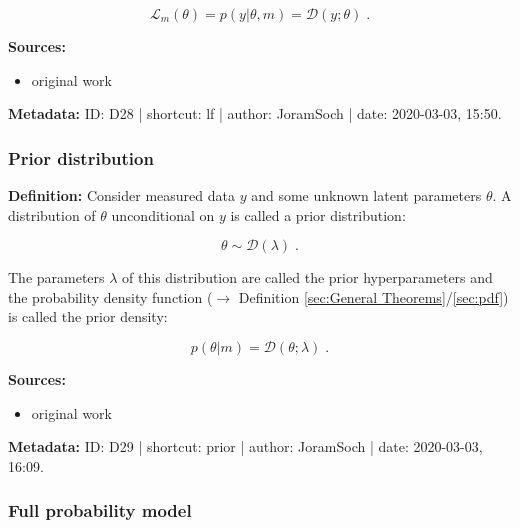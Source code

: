 \documentclass[a4paper,12pt,twoside]{book}
\begin{document}
\begin{equation} \label{eq:lf-lf}
\mathcal{L}_m(\theta) = p(y|\theta,m) = \mathcal{D}(y; \theta) \; .
\end{equation}


\vspace{1em}
\textbf{Sources:}
\begin{itemize}
\item original work\end{itemize}


\vspace{1em}
\textbf{Metadata:} ID: D28 | shortcut: lf | author: JoramSoch | date: 2020-03-03, 15:50.
\vspace{1em}



\subsubsection[\textit{Prior distribution}]{Prior distribution} \label{sec:prior}
\setcounter{equation}{0}

\textbf{Definition:} Consider measured data $y$ and some unknown latent parameters $\theta$. A distribution of $\theta$ unconditional on $y$ is called a prior distribution:

\begin{equation} \label{eq:prior-prior}
\theta \sim \mathcal{D}(\lambda) \; .
\end{equation}

The parameters $\lambda$ of this distribution are called the prior hyperparameters and the probability density function ($\rightarrow$ Definition \ref{sec:General Theorems}/\ref{sec:pdf}) is called the prior density:

\begin{equation} \label{eq:prior-prior-pdf}
p(\theta|m) = \mathcal{D}(\theta; \lambda) \; .
\end{equation}


\vspace{1em}
\textbf{Sources:}
\begin{itemize}
\item original work\end{itemize}


\vspace{1em}
\textbf{Metadata:} ID: D29 | shortcut: prior | author: JoramSoch | date: 2020-03-03, 16:09.
\vspace{1em}



\subsubsection[\textit{Full probability model}]{Full probability model} \label{sec:fpm}
\setcounter{equation}{0}
\end{document}
